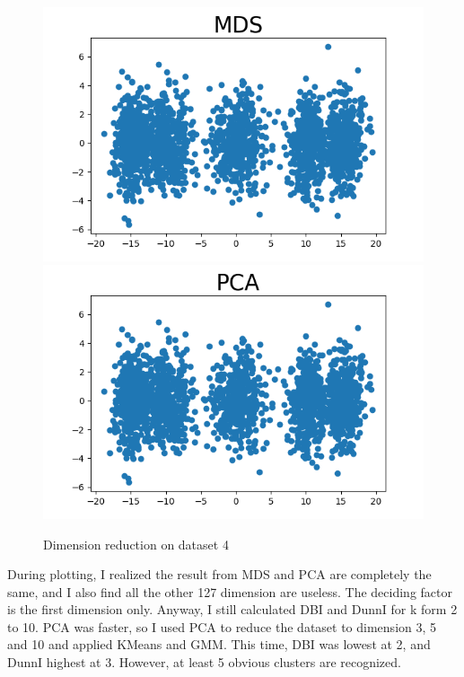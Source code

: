 \documentclass[conference]{IEEEtran}
\begin{document}
\begin{figure}[htbp]
	\includegraphics[scale=0.28]{P4RM.png}
	\includegraphics[scale=0.28]{P4RP.png}
	\caption{Dimension reduction on dataset 4}
	\label{P4RAW}
\end{figure}

During plotting, I realized the result from MDS and PCA are completely the same, and I also find all the other 127 dimension are useless. The deciding factor is the first dimension only. Anyway, I still calculated DBI and DunnI for k form 2 to 10. PCA was faster, so I used PCA to reduce the dataset to dimension 3, 5 and 10 and applied KMeans and GMM. This time, DBI was lowest at 2, and DunnI highest at 3. However, at least 5 obvious clusters are recognized.
\end{document}
